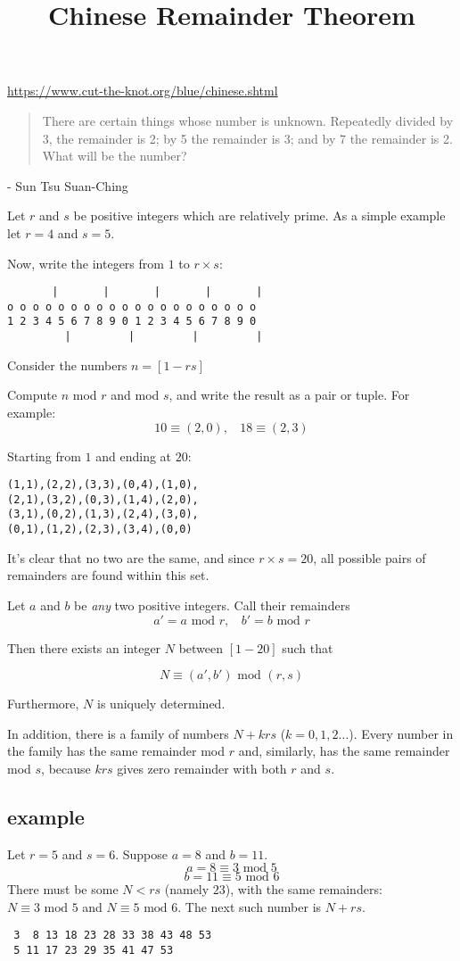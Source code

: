 \documentclass[11pt, oneside]{article}
\title{Chinese Remainder Theorem}
\date{}
\begin{document}
\maketitle
\Large

\url{https://www.cut-the-knot.org/blue/chinese.shtml}

\begin{quote}There are certain things whose number is unknown. Repeatedly divided by 3, the remainder is 2; by 5 the remainder is 3; and by 7 the remainder is 2. What will be the number?\end{quote}

- Sun Tsu Suan-Ching

Let $r$ and $s$ be positive integers which are relatively prime.  As a simple example let $r=4$ and $s=5$.  

Now, write the integers from $1$ to $r \times s$:
\begin{verbatim}
       |       |       |       |       | 
o o o o o o o o o o o o o o o o o o o o
1 2 3 4 5 6 7 8 9 0 1 2 3 4 5 6 7 8 9 0
         |         |         |         |
\end{verbatim}

Consider the numbers $n = [1-rs]$ 

Compute $n$ mod $r$ and mod $s$, and write the result as a pair or tuple.  For example:
\[ 10 \equiv (2,0), \ \ \ \ 18 \equiv (2,3) \]

Starting from $1$ and ending at $20$:
\begin{verbatim}
(1,1),(2,2),(3,3),(0,4),(1,0),
(2,1),(3,2),(0,3),(1,4),(2,0),
(3,1),(0,2),(1,3),(2,4),(3,0),
(0,1),(1,2),(2,3),(3,4),(0,0)
\end{verbatim}

It's clear that no two are the same, and since $r \times s = 20$, all possible pairs of remainders are found within this set.   

Let $a$ and $b$ be \emph{any} two positive integers.  Call their remainders \[ a' = a \text{ mod } r, \ \ \ \ b' = b \text{ mod } r \]

Then there exists an integer $N$ between $[1-20]$ such that

\[ N \equiv (a',b') \text{ mod } (r,s) \]

Furthermore, $N$ is uniquely determined.

In addition, there is a family of numbers $N + krs$ ($ k = 0, 1, 2 \dots$).  Every number in the family has the same remainder mod $r$ and, similarly, has the same remainder mod $s$, because $krs$ gives zero remainder with both $r$ and $s$.

\subsection*{example}
Let $r = 5$ and $s = 6$.  Suppose $a = 8$ and $b = 11$.
\[ a = 8 \equiv 3 \text{ mod } 5 \]
\[ b = 11 \equiv 5 \text{ mod } 6 \]
There must be some $N < rs$ (namely $23$), with the same remainders:  $N \equiv 3 \text{ mod } 5$ and $N \equiv 5 \text{ mod } 6$.  The next such number is $N + rs$.
\begin{verbatim}
 3  8 13 18 23 28 33 38 43 48 53
 5 11 17 23 29 35 41 47 53
\end{verbatim}
\end{document}
